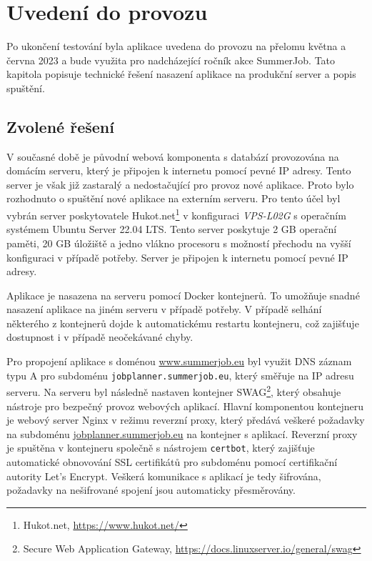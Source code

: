 \chapter{Uvedení do provozu}

Po ukončení testování byla aplikace uvedena do provozu na přelomu května a června 2023 a bude využita
pro nadcházející ročník akce SummerJob. Tato kapitola popisuje
technické řešení nasazení aplikace na produkční server a popis spuštění.

\section{Zvolené řešení}

V současné době je původní webová komponenta s databází provozována na domácím serveru,
který je připojen k internetu pomocí pevné IP adresy. Tento server je však již zastaralý a
nedostačující pro provoz nové aplikace. Proto bylo rozhodnuto o spuštění nové aplikace na
externím serveru. Pro tento účel byl vybrán server poskytovatele Hukot.net\footnote{Hukot.net, \url{https://www.hukot.net/}}
v konfiguraci \textit{VPS-L02G} s operačním systémem Ubuntu Server 22.04 LTS. Tento server
poskytuje 2 GB operační paměti, 20 GB úložiště a jedno vlákno procesoru s možností přechodu
na vyšší konfiguraci v případě potřeby. Server je připojen k internetu pomocí pevné IP adresy.

Aplikace je nasazena na serveru pomocí Docker kontejnerů. To umožňuje snadné nasazení aplikace
na jiném serveru v případě potřeby. V případě selhání některého z kontejnerů dojde k automatickému
restartu kontejneru, což zajišťuje dostupnost i v případě neočekávané chyby.

Pro propojení aplikace s doménou \url{www.summerjob.eu} byl využit DNS záznam typu A pro subdoménu
\texttt{jobplanner.summerjob.eu}, který směřuje na IP adresu serveru. Na serveru byl následně
nastaven kontejner SWAG\footnote{Secure Web Application Gateway, \url{https://docs.linuxserver.io/general/swag}}, který obsahuje nástroje pro bezpečný provoz webových aplikací.
Hlavní komponentou kontejneru je webový server Nginx v režimu reverzní proxy, který předává veškeré požadavky na subdoménu
\href{https://jobplanner.summerjob.eu}{jobplanner.summerjob.eu} na kontejner s aplikací. Reverzní proxy je spuštěna v kontejneru
společně s nástrojem \texttt{certbot}, který zajišťuje automatické obnovování SSL certifikátů pro subdoménu
pomocí certifikační autority Let's Encrypt. Veškerá komunikace s aplikací je tedy šifrována, požadavky na
nešifrované spojení jsou automaticky přesměrovány. 

